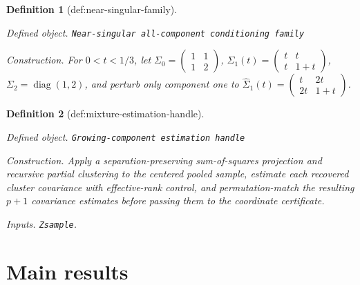 \documentclass{article}
\newtheorem{definition}{Definition}
\begin{document}
\begin{definition}[def:near-singular-family]\label{def:near-singular-family}
\par\smallskip\noindent\emph{Defined object.} \texttt{Near-\allowbreak{}singular all-\allowbreak{}component conditioning family}
\par\smallskip\noindent\emph{Construction.} For \(0<t<1/3\), let \(\Sigma_0=\begin{pmatrix}1&1\\1&2\end{pmatrix}\), \(\Sigma_1(t)=\begin{pmatrix}t&t\\t&1+t\end{pmatrix}\), \(\Sigma_2=\operatorname{diag}(1,2)\), and perturb only component one to \(\widehat\Sigma_1(t)=\begin{pmatrix}t&2t\\2t&1+t\end{pmatrix}\).
\end{definition}

\begin{definition}[def:mixture-estimation-handle]\label{def:mixture-estimation-handle}
\par\smallskip\noindent\emph{Defined object.} \texttt{Growing-\allowbreak{}component estimation handle}
\par\smallskip\noindent\emph{Construction.} Apply a separation-preserving sum-of-squares projection and recursive partial clustering to the centered pooled sample, estimate each recovered cluster covariance with effective-rank control, and permutation-match the resulting \(p+1\) covariance estimates before passing them to the coordinate certificate.
\par\smallskip\noindent\emph{Inputs.} \texttt{Zsample}.
\end{definition}

\section{Main results}
\end{document}
